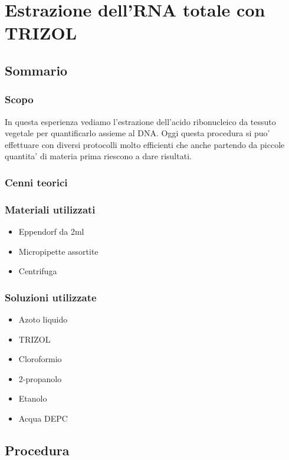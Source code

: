 \section{\LARGE{Estrazione dell’RNA totale con TRIZOL}}

\vspace{0.6cm}


\subsection{Sommario}


\subsubsection{Scopo}
In questa esperienza vediamo l’estrazione dell’acido ribonucleico da tessuto vegetale per quantificarlo assieme al DNA. Oggi questa procedura si puo’ effettuare con diversi protocolli molto efficienti che anche partendo da piccole quantita’ di materia prima riescono a dare risultati.

\subsubsection{Cenni teorici}

\subsubsection{Materiali utilizzati}

\begin{itemize}
\item Eppendorf da 2ml
\item Micropipette assortite
\item Centrifuga
\end{itemize}

\subsubsection{Soluzioni utilizzate}
\begin{itemize}
\item Azoto liquido
\item TRIZOL
\item Cloroformio
\item 2-propanolo
\item Etanolo
\item Acqua DEPC
\end{itemize}

\subsection{Procedura}

